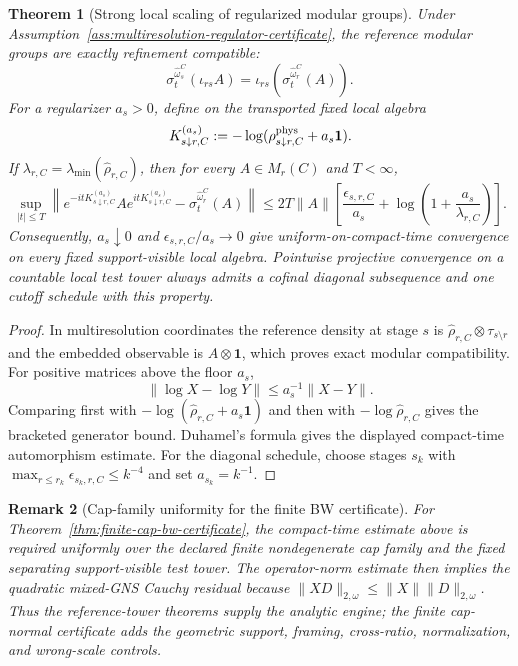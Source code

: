 \documentclass[11pt]{article}
\newtheorem{theorem}{Theorem}[section]
\newtheorem{remark}[theorem]{Remark}
\begin{document}
\begin{theorem}[Strong local scaling of regularized modular groups]\label{thm:strong-local-modular-scaling}
Under Assumption~\ref{ass:multiresolution-regulator-certificate}, the reference modular groups
are exactly refinement compatible:
\[
\sigma_t^{\widehat\omega_s^C}(\iota_{rs}A)
=\iota_{rs}(\sigma_t^{\widehat\omega_r^C}(A)).
\]
For a regularizer \(a_s>0\), define on the transported fixed local algebra
\[
K_{s\downarrow r,C}^{(a_s)}
:=-\log(\rho^{\rm phys}_{s\downarrow r,C}+a_s\mathbf1).
\]
If \(\lambda_{r,C}=\lambda_{\min}(\widehat\rho_{r,C})\), then for every
\(A\in M_r(C)\) and \(T<\infty\),
\[
\sup_{|t|\le T}
\left\|
e^{-itK_{s\downarrow r,C}^{(a_s)}}A
e^{itK_{s\downarrow r,C}^{(a_s)}}
-\sigma_t^{\widehat\omega_r^C}(A)
\right\|
\le
2T\|A\|
\left[
\frac{\epsilon_{s,r,C}}{a_s}
+\log\!\left(1+\frac{a_s}{\lambda_{r,C}}\right)
\right].
\]
Consequently, \(a_s\downarrow0\) and \(\epsilon_{s,r,C}/a_s\to0\) give
uniform-on-compact-time convergence on every fixed support-visible local algebra. Pointwise
projective convergence on a countable local test tower always admits a cofinal diagonal
subsequence and one cutoff schedule with this property.
\end{theorem}

\begin{proof}
In multiresolution coordinates the reference density at stage \(s\) is
\(\widehat\rho_{r,C}\otimes\tau_{s\setminus r}\) and the embedded observable is
\(A\otimes\mathbf1\), which proves exact modular compatibility. For positive matrices above the
floor \(a_s\),
\[
\|\log X-\log Y\|\le a_s^{-1}\|X-Y\|.
\]
Comparing first with \(-\log(\widehat\rho_{r,C}+a_s\mathbf1)\) and then with
\(-\log\widehat\rho_{r,C}\) gives the bracketed generator bound. Duhamel's formula gives the
displayed compact-time automorphism estimate. For the diagonal schedule, choose stages \(s_k\)
with \(\max_{r\le r_k}\epsilon_{s_k,r,C}\le k^{-4}\) and set \(a_{s_k}=k^{-1}\).
\end{proof}

\begin{remark}[Cap-family uniformity for the finite BW certificate]\label{rem:cap-family-uniformity}
For Theorem~\ref{thm:finite-cap-bw-certificate}, the compact-time estimate above is required
uniformly over the declared finite nondegenerate cap family and the fixed separating
support-visible test tower. The operator-norm estimate then implies the quadratic mixed-GNS
Cauchy residual because \(\|XD\|_{2,\omega}\le\|X\|\|D\|_{2,\omega}\). Thus the reference-tower
theorems supply the analytic engine; the finite cap-normal certificate adds the geometric support,
framing, cross-ratio, normalization, and wrong-scale controls.
\end{remark}
\end{document}

